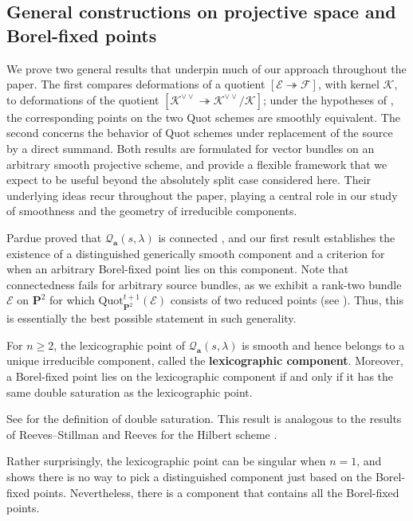\documentclass[leqno,11pt,a4paper]{amsart}
\newenvironment{customthm}[1]
  {\renewcommand\theinnercustomthm{#1}\innercustomthm}
  {\endinnercustomthm}
\theoremstyle{definition}
\numberwithin{equation}{section}
\newcommand{\bfa}{\mathbf{a}}
\newcommand{\Quot}{\mathrm{Quot}}
\newcommand{\PP}{\mathbf{P}}
\newcommand{\EE}{\mathscr{E}}
\newcommand{\FF}{\mathscr{F}}
\newcommand{\KK}{\mathscr{K}}
\newcommand{\QQ}{\mathcal{Q}}
\begin{document}
\subsection{General constructions on projective space and Borel-fixed points}
We prove two general results that underpin much of our approach throughout the paper.
The first compares deformations of a quotient $[\EE\twoheadrightarrow\FF]$, with kernel $\KK$, to deformations of the quotient $[\KK^{\vee\vee}\twoheadrightarrow\KK^{\vee\vee}/\KK]$; under the hypotheses of , the corresponding points on the two Quot schemes are smoothly equivalent. 
The second concerns the behavior of Quot schemes under replacement of the source by a direct summand. 
Both results are formulated for vector bundles on an arbitrary smooth projective scheme, and provide a flexible framework that we expect to be useful beyond the absolutely split case considered here. 
Their underlying ideas recur throughout the paper, playing a central role in our study of smoothness and the geometry of irreducible components.

Pardue proved that $\QQ_{\bfa}(s,\lambda)$ is connected \cite{Pardue}, and our first result establishes the existence of a distinguished generically smooth component and a criterion for when an arbitrary Borel-fixed point lies on this component.
Note that connectedness fails for arbitrary source bundles, as we exhibit a rank-two bundle $\EE$ on $\PP^2$ for which $\Quot_{\PP^2}^{t+1}(\EE)$ consists of two reduced points (see ). Thus, this is essentially the best possible statement in such generality.

\begin{customthm}{A}
For $n\geq 2$, the lexicographic point of $\QQ_{\bfa}(s,\lambda)$ is smooth and hence belongs to a unique irreducible component, called the
\textbf{lexicographic component}. Moreover, a Borel-fixed point lies on the lexicographic component if and only if it has the same double saturation as the lexicographic point.
\end{customthm}

See  for the definition of double saturation. 
This result is analogous to the results of Reeves--Stillman and Reeves for the Hilbert scheme \cite{RS97, Reeves_radius}.

Rather surprisingly, the lexicographic point can be singular when $n=1$, and  shows there is no way to pick a distinguished component just based on the Borel-fixed points. 
Nevertheless, there is a component that contains all the Borel-fixed points.
\end{document}
